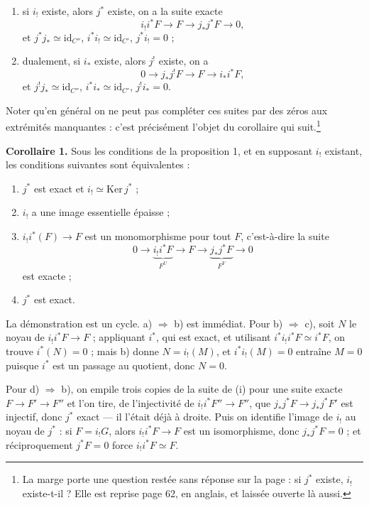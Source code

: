 \documentclass[11pt,a4paper]{article}
\begin{document}
\begin{enumerate}
\item[(i)] si $i_{!}$ existe, alors $j^{*}$ existe, on a la suite exacte
\[
  i_{!} i^{*} F \longrightarrow F \longrightarrow j_{*} j^{*} F
  \longrightarrow 0 ,
\]
et $j^{*}j_{*} \simeq \mathrm{id}_{C''}$, $i^{*}i_{!} \simeq \mathrm{id}_{C'}$,
$j^{*}i_{!} = 0$ ;
\item[(i bis)] dualement, si $i_{*}$ existe, alors $j^{!}$ existe, on a
\[
  0 \longrightarrow j_{*} j^{!} F \longrightarrow F \longrightarrow
  i_{*} i^{*} F ,
\]
et $j^{!}j_{*} \simeq \mathrm{id}_{C''}$, $i^{*}i_{*} \simeq \mathrm{id}_{C'}$,
$j^{!}i_{*} = 0$.
\end{enumerate}

Noter qu'en général on ne peut pas compléter ces suites par des zéros aux
extrémités manquantes : c'est précisément l'objet du corollaire qui
suit.\footnote{La marge porte une question restée sans réponse sur la page :
si $j^{*}$ existe, $i_{!}$ existe-t-il ? Elle est reprise page 62, en anglais,
et laissée ouverte là aussi.}


\textbf{Corollaire 1.} Sous les conditions de la proposition 1, et en supposant
$i_{!}$ existant, les conditions suivantes sont équivalentes :

\begin{enumerate}
\item[a)] $j^{*}$ est exact et $i_{!} \simeq \mathrm{Ker}\,j^{*}$ ;
\item[b)] $i_{!}$ a une image essentielle épaisse ;
\item[c)] $i_{!}i^{*}(F) \to F$ est un monomorphisme pour tout $F$,
c'est-à-dire la suite
\[
  0 \longrightarrow \underbrace{i_{!} i^{*} F}_{F^{U}} \longrightarrow F
  \longrightarrow \underbrace{j_{*} j^{*} F}_{F^{Y}} \longrightarrow 0
\]
est exacte ;
\item[d)] $j^{*}$ est exact.
\end{enumerate}

La démonstration est un cycle. a) $\Rightarrow$ b) est immédiat. Pour
b) $\Rightarrow$ c), soit $N$ le noyau de $i_{!}i^{*}F \to F$ ; appliquant
$i^{*}$, qui est exact, et utilisant $i^{*}i_{!}i^{*}F \simeq i^{*}F$, on
trouve $i^{*}(N) = 0$ ; mais b) donne $N = i_{!}(M)$, et
$i^{*}i_{!}(M) = 0$ entraîne $M = 0$ puisque $i^{*}$ est un passage au
quotient, donc $N = 0$.

Pour d) $\Rightarrow$ b), on empile trois copies de la suite de (i) pour une
suite exacte $F \to F' \to F''$ et l'on tire, de l'injectivité de
$i_{!}i^{*}F'' \to F''$, que $j_{*}j^{*}F \to j_{*}j^{*}F'$ est injectif, donc
$j^{*}$ exact — il l'était déjà à droite. Puis on identifie l'image de $i_{!}$
au noyau de $j^{*}$ : si $F = i_{!}G$, alors $i_{!}i^{*}F \to F$ est un
isomorphisme, donc $j_{*}j^{*}F = 0$ ; et réciproquement $j^{*}F = 0$ force
$i_{!}i^{*}F \simeq F$.
\end{document}
